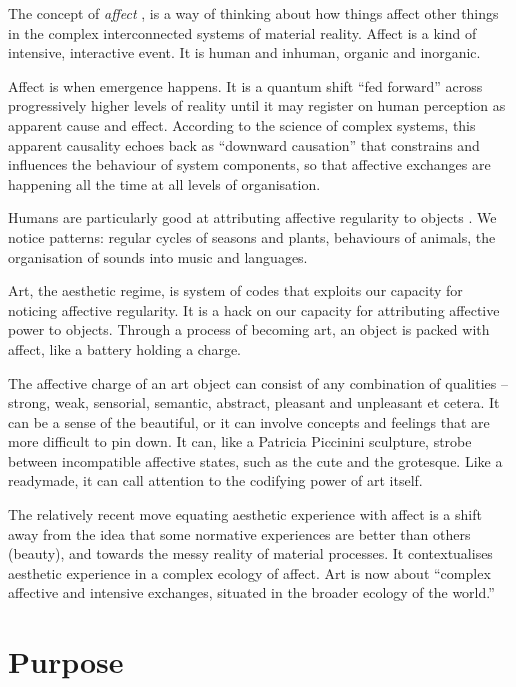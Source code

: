 \documentclass[letter:wpaper]{article}
\begin{document}
    The concept of \emph{affect} \citep{MassumiTheAtnmyOfAffct1995}, is a way of thinking about how things affect other things in the complex interconnected systems of material reality. Affect is a kind of intensive, interactive event. It is human and inhuman, organic and inorganic.

    Affect is when emergence happens. It is a quantum shift ``fed forward'' across progressively higher levels of reality \citep[p.37]{MassumiPrblsFrThVrtl2002} until it may register on human perception as apparent cause and effect. According to the science of complex systems, this apparent causality echoes back as ``downward causation'' \citep[p.?]{FlackCrsGrnng2017} that constrains and influences the behaviour of system components, so that affective exchanges are happening all the time at all levels of organisation.
    
    Humans are particularly good at attributing affective regularity to objects \citep{FristonThFrEnrgPrncpl2010} \citep{DeaconTheSymbolicSpecies1998}. We notice patterns: regular cycles of seasons and plants, behaviours of animals, the organisation of sounds into music and languages.
    
    Art, the aesthetic regime, is system of codes that exploits our capacity for noticing affective regularity. It is a hack on our capacity for attributing affective power to objects. Through a process of becoming art, an object is packed with affect, like a battery holding a charge. 
    
    The affective charge of an art object can consist of any combination of qualities – strong, weak, sensorial, semantic, abstract, pleasant and unpleasant et cetera. It can be a sense of the beautiful, or it can involve concepts and feelings that are more difficult to pin down. It can, like a Patricia Piccinini sculpture, strobe between incompatible affective states, such as the cute and the grotesque. Like a readymade, it can call attention to the codifying power of art itself.

    The relatively recent move equating aesthetic experience with affect is a shift away from the idea that some normative experiences are better than others (beauty), and towards the messy reality of material processes. It contextualises aesthetic experience in a complex ecology of affect. Art is now about “complex affective and intensive exchanges, situated in the broader ecology of the world.” \citep[p.155]{HighmoreBttrAftrTst2010}

    \section{Purpose}
\end{document}
